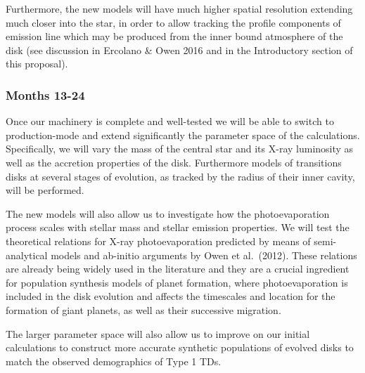 \documentclass[10pt,fleqn,twoside]{article}
\begin{document}
Furthermore, the new models will have much higher spatial
resolution extending much closer into the star, in order to allow
tracking the profile components of emission line which may be produced from the inner bound
atmosphere of the disk (see discussion in Ercolano \& Owen 2016 and in
the Introductory section of this proposal).


\subsubsection{Months 13-24}

Once our machinery is complete and well-tested we will be able to
switch to production-mode and extend significantly the parameter space
of the calculations. Specifically, we will vary the mass of the central star and its X-ray
luminosity as well as the accretion properties of the
disk. Furthermore models of transitions disks at several stages 
of evolution, as tracked by the radius of their inner cavity, will be
performed. 


The new models will also allow us to investigate how
the photoevaporation process scales with stellar mass and stellar emission
properties. We will test the theoretical relations for X-ray photoevaporation 
predicted by means of semi-analytical models and ab-initio arguments
by Owen et al.\ (2012). These relations are already being widely used in
the literature and they are a crucial ingredient for population
synthesis models of planet formation, where photoevaporation is
included in the disk evolution and affects the timescales and location for
the formation of giant planets, as well as their successive
migration. 

The larger parameter space will also allow us to improve on our
initial calculations to construct more accurate synthetic
populations of evolved disks to match
the observed demographics of Type 1 TDs.  \\
\end{document}
